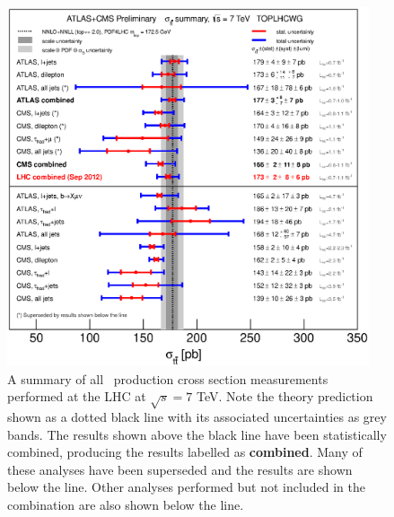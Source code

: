 \begin{figure}[htbp]
  \centering
  \includegraphics[width=0.95\textwidth]{PartTopQuark/Plots/tt_xsec_7TeV.eps}
  \caption{A summary of all \ttbar\ production cross section measurements performed at the LHC at $\sqrt{s}=7$ TeV. Note the theory prediction shown as a dotted black line with its associated uncertainties as grey bands. The results shown above the black line have been statistically combined, producing the results labelled as \textbf{combined}. Many of these analyses have been superseded and the results are shown below the line. Other analyses performed but not included in the combination are also shown below the line.}
  \label{fig:TopQuarkPairProductionSummaryLHC}
\end{figure}

